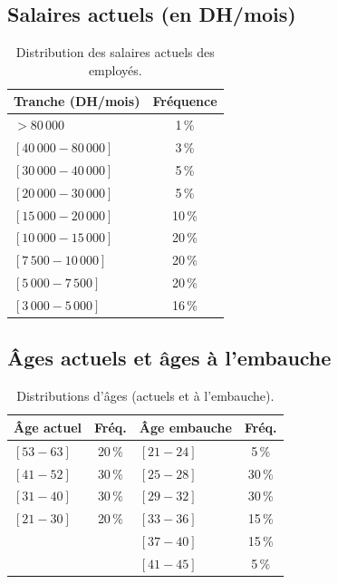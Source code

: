 \documentclass[12pt,a4paper,oneside]{report}
\begin{document}
\subsection{Salaires actuels (en DH/mois)}

\begin{table}[H]
\centering
\caption{Distribution des salaires actuels des employés.}
\label{tab:dist-sal-actuels}
\begin{tabular}{lc}
\toprule
\textbf{Tranche (DH/mois)} & \textbf{Fréquence} \\
\midrule
$> 80\,000$            & 1\,\% \\
$[40\,000 - 80\,000]$  & 3\,\% \\
$[30\,000 - 40\,000]$  & 5\,\% \\
$[20\,000 - 30\,000]$  & 5\,\% \\
$[15\,000 - 20\,000]$  & 10\,\% \\
$[10\,000 - 15\,000]$  & 20\,\% \\
$[7\,500 - 10\,000]$   & 20\,\% \\
$[5\,000 - 7\,500]$    & 20\,\% \\
$[3\,000 - 5\,000]$    & 16\,\% \\
\bottomrule
\end{tabular}
\end{table}

\subsection{Âges actuels et âges à l'embauche}

\begin{table}[H]
\centering
\caption{Distributions d'âges (actuels et à l'embauche).}
\label{tab:dist-ages}
\begin{tabular}{lc|lc}
\toprule
\textbf{Âge actuel} & \textbf{Fréq.} &
\textbf{Âge embauche} & \textbf{Fréq.} \\
\midrule
$[53-63]$ & 20\,\% & $[21-24]$ & 5\,\% \\
$[41-52]$ & 30\,\% & $[25-28]$ & 30\,\% \\
$[31-40]$ & 30\,\% & $[29-32]$ & 30\,\% \\
$[21-30]$ & 20\,\% & $[33-36]$ & 15\,\% \\
          &        & $[37-40]$ & 15\,\% \\
          &        & $[41-45]$ & 5\,\% \\
\bottomrule
\end{tabular}
\end{table}
\end{document}

